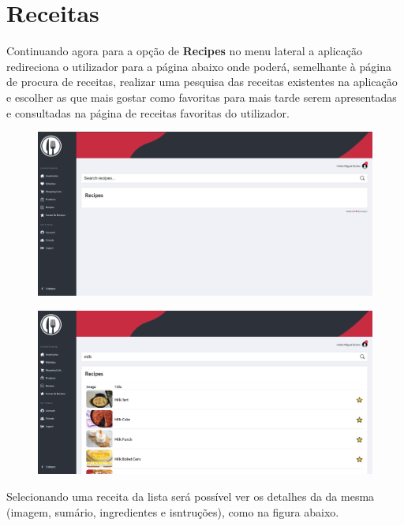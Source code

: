 \documentclass[a4paper]{report}
\begin{document}
    \section{Receitas}

    Continuando agora para a opção de \textbf{Recipes} no menu lateral a 
    aplicação redireciona o utilizador para a página abaixo onde poderá,
    semelhante à página de procura de receitas, realizar uma pesquisa
    das receitas existentes na aplicação e escolher as que mais gostar
    como favoritas para mais tarde serem apresentadas e consultadas na
    página de receitas favoritas do utilizador.

    \begin{figure}[H]
        \centering
            \includegraphics[width=\textwidth]{images/produto_final/procura_de_receitas.png}
    \end{figure}

    \begin{figure}[H]
        \centering
            \includegraphics[width=\textwidth]{images/produto_final/procura_de_receitas_efetuadas.png}
    \end{figure}

    Selecionando uma receita da lista será possível ver os detalhes da
    da mesma (imagem, sumário, ingredientes e isntruções), como na 
    figura abaixo.
\end{document}
